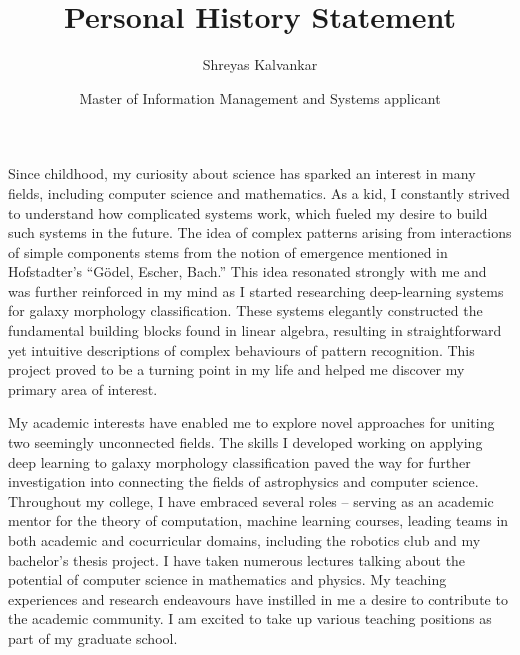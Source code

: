 \documentclass[11pt]{article}
\title{Personal History Statement}
\author{Shreyas Kalvankar}
\date{Master of Information Management and Systems applicant}
\begin{document}
  \maketitle%
  \thispagestyle{empty}
  \vspace{5pt}

\hspace{0.25in}Since childhood, my curiosity about science has sparked an
interest in many fields, including computer science and mathematics. As a kid, I
constantly strived to understand how complicated systems work, which fueled my
desire to build such systems in the future. The idea of complex patterns arising
from interactions of simple components stems from the notion of emergence
mentioned in Hofstadter’s “Gödel, Escher, Bach.” This idea resonated strongly
with me and was further reinforced in my mind as I started researching
deep-learning systems for galaxy morphology classification. These systems
elegantly constructed the fundamental building blocks found in linear algebra,
resulting in straightforward yet intuitive descriptions of complex behaviours of
pattern recognition. This project proved to be a turning point in my life and
helped me discover my primary area of interest.

\hspace{0.25in}My academic interests have enabled me to explore novel approaches
for uniting two seemingly unconnected fields. The skills I developed working on
applying deep learning to galaxy morphology classification paved the way for
further investigation into connecting the fields of astrophysics and computer
science. Throughout my college, I have embraced several roles -- serving as an
academic mentor for the theory of computation, machine learning courses, leading
teams in both academic and cocurricular domains, including the robotics club and
my bachelor’s thesis project. I have taken numerous lectures talking about the
potential of computer science in mathematics and physics. My teaching
experiences and research endeavours have instilled in me a desire to contribute
to the academic community. I am excited to take up various teaching positions as
part of my graduate school.
\end{document}
